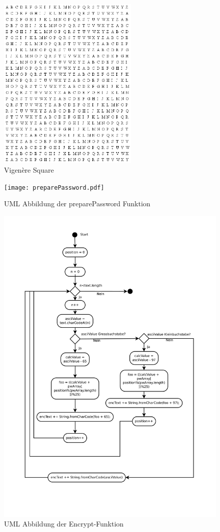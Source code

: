 \documentclass[11pt,paper=a4,final]{scrartcl}
\begin{document}
\begin{figure}[h!]
  \centering
  \includegraphics[width=0.6\textwidth]{square.png}
  \caption{Vigen\`ere Square}
  \label{fig:square}
\end{figure}
\begin{figure}[h!]
  \centering
  \texttt{[image: preparePassword.pdf]}
  \caption{UML Abbildung der preparePassword Funktion}
  \label{fig:preparePassword}
\end{figure}
\label{sec:grafiken}
\begin{figure}[h!]
  \centering
  \includegraphics[width=\textwidth]{encrypt.pdf}
  \caption{UML Abbildung der Encrypt-Funktion}
  \label{fig:encrypt}
\end{figure}
\end{document}

